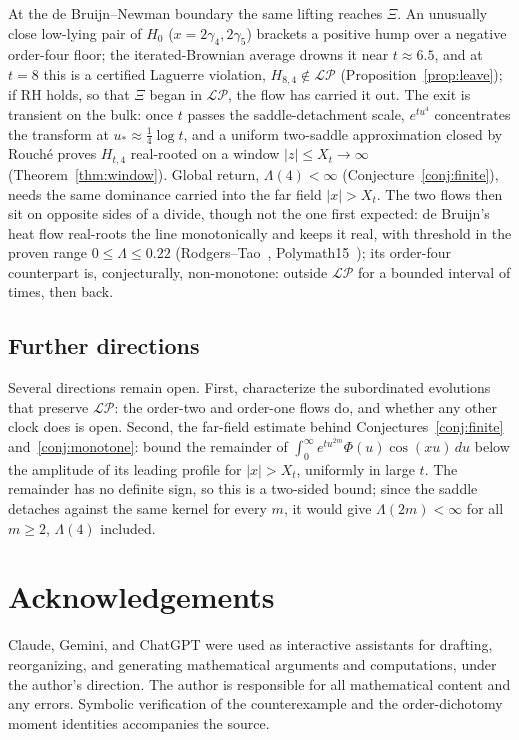 \documentclass[11pt,reqno]{amsart}
\theoremstyle{plain}
\theoremstyle{definition}
\theoremstyle{remark}
\newcommand{\LP}{\mathcal{LP}}
\begin{document}
At the de Bruijn--Newman boundary the same lifting reaches $\Xi$. An unusually
close low-lying pair of $H_0$ ($x=2\gamma_4,2\gamma_5$) brackets a positive hump
over a negative order-four floor; the iterated-Brownian average drowns it near
$t\approx6.5$, and at $t=8$ this is a certified Laguerre violation,
$H_{8,4}\notin\LP$ (Proposition~\ref{prop:leave}); if RH holds, so that $\Xi$
began in $\LP$, the flow has carried it out. The exit is transient on the bulk:
once $t$ passes the saddle-detachment scale, $e^{tu^4}$ concentrates the
transform at $u_*\approx\tfrac14\log t$, and a uniform two-saddle approximation
closed by Rouch\'e proves $H_{t,4}$ real-rooted on a window $|z|\le X_t\to\infty$
(Theorem~\ref{thm:window}). Global return, $\Lambda(4)<\infty$
(Conjecture~\ref{conj:finite}), needs the same dominance carried into the far
field $|x|>X_t$. The two
flows then sit on opposite sides of a divide, though not the one first expected:
de Bruijn's heat flow real-roots the line monotonically and keeps it real,
with threshold in the proven range $0\le\Lambda\le0.22$
(Rodgers--Tao~\cite{RodgersTao}, Polymath15~\cite{Polymath15}); its order-four
counterpart is, conjecturally, non-monotone: outside $\LP$ for a bounded
interval of times, then back.

\subsection*{Further directions}
Several directions remain open. First, characterize the subordinated evolutions
that preserve $\LP$: the order-two and order-one flows do, and whether any other
clock does is open. Second, the far-field estimate behind
Conjectures~\ref{conj:finite} and~\ref{conj:monotone}:
bound the remainder of $\int_0^\infty e^{tu^{2m}}\Phi(u)\cos(xu)\,du$ below the
amplitude of its leading profile for $|x|>X_t$, uniformly in large $t$. The
remainder has no definite sign, so this is a two-sided bound; since the saddle
detaches against the same kernel for every $m$, it would give $\Lambda(2m)<\infty$
for all $m\ge2$, $\Lambda(4)$ included.

\section*{Acknowledgements}
Claude, Gemini, and ChatGPT were used as interactive assistants for drafting,
reorganizing, and generating mathematical arguments and computations, under the
author's direction. The author is responsible for all mathematical content and any
errors. Symbolic verification of the counterexample and the order-dichotomy moment
identities accompanies the source.
\end{document}

